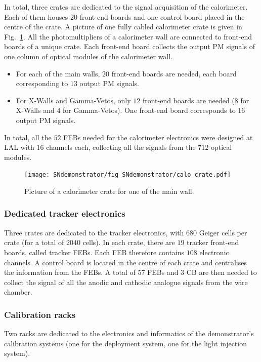 In total, three crates are dedicated to the signal acquisition of the calorimeter.
Each of them houses $20$ front-end boards and one control board placed in the centre of the crate.
A picture of one fully cabled calorimeter crate is given in Fig.~\ref{fig:calo_crate}.
All the photomultipliers of a calorimeter wall are connected to front-end boards of a unique crate.
Each front-end board collects the output PM signals of one column of optical modules of the calorimeter wall.
\begin{itemize}
\item For each of the main walls, $20$ front-end boards are needed, each board corresponding to $13$ output PM signals.
\item For X-Walls and Gamma-Vetos, only $12$ front-end boards are needed ($8$ for X-Walls and $4$ for Gamma-Vetos).
  One front-end board corresponds to $16$ output PM signals.
\end{itemize}
In total, all the $52$ FEBs needed for the calorimeter electronics were designed at LAL with $16$ channels each, collecting all the signals from the $712$ optical modules.
\begin{figure}[h]
  \centering
  \texttt{[image: SNdemonstrator/fig\_SNdemonstrator/calo\_crate.pdf]}
  \caption{Picture of a calorimeter crate for one of the main wall.
    \label{fig:calo_crate}}
\end{figure}

\subsubsection*{Dedicated tracker electronics}


Three crates are dedicated to the tracker electronics, with $680$ Geiger cells per crate (for a total of $2040$ cells).
In each crate, there are $19$ tracker front-end boards, called tracker FEBs.
Each FEB therefore contains $108$ electronic channels.
A control board is located in the centre of each crate and centralises the information from the FEBs.
A total of $57$ FEBs and $3$ CB are then needed to collect the signal of all the anodic and cathodic analogue signals from the wire chamber.

\subsubsection*{Calibration racks}

Two racks are dedicated to the electronics and informatics of the demonstrator's calibration systems (one for the deployment system, one for the light injection system).


